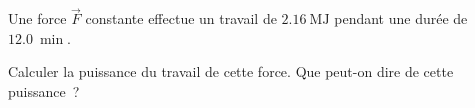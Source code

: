 Une force $\vec{F}$ constante effectue un travail de $\qty{2.16}{\mega\J}$
pendant une durée de $\qty{12.0}{\min}$.

Calculer la puissance du travail de cette force. Que peut-on dire de cette
puissance~?

